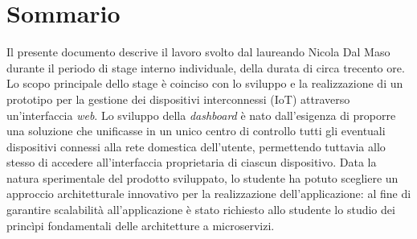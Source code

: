 
\cleardoublepage
{}
{}
\begingroup
\let\clearpage\relax
\let\cleardoublepage\relax
\let\cleardoublepage\relax

\chapter*{Sommario}

Il presente documento descrive il lavoro svolto dal laureando Nicola Dal Maso durante il periodo di stage interno individuale, della durata di circa trecento ore.
Lo scopo principale dello stage è coinciso con lo sviluppo e la realizzazione di un prototipo per la gestione dei dispositivi interconnessi (IoT) attraverso un'interfaccia \emph{web}.
Lo sviluppo della \emph{dashboard} è nato dall'esigenza di proporre una soluzione che unificasse in un unico centro di controllo tutti gli eventuali dispositivi connessi alla rete domestica dell'utente, permettendo tuttavia allo stesso di accedere all'interfaccia proprietaria di ciascun dispositivo.
Data la natura sperimentale del prodotto sviluppato, lo studente ha potuto scegliere un approccio architetturale innovativo per la realizzazione dell'applicazione: al fine di garantire scalabilità all'applicazione è stato richiesto allo studente lo studio dei princìpi fondamentali delle architetture a microservizi.


%
%

\endgroup			

\vfill

